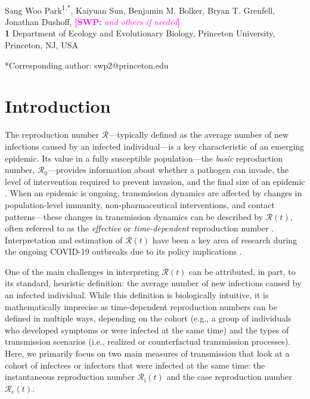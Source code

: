 \documentclass[12pt]{article}
\date{\today}
\newcommand{\comment}{\showcomment}
\newcommand{\showcomment}[3]{\textcolor{#1}{\textbf{[#2: }\textsl{#3}\textbf{]}}}
\newcommand{\swp}[1]{\comment{magenta}{SWP}{#1}}
\newcommand{\Rx}[1]{\ensuremath{{\mathcal R}_{#1}}\xspace}
\newcommand{\Ro}{\Rx{0}}
\newcommand{\Rc}{\Rx{\mathrm{c}}}
\newcommand{\Ri}{\Rx{\mathrm{i}}}
\newcommand{\RR}{\ensuremath{{\mathcal R}}\xspace}
\begin{document}
\begin{flushleft}{
	\Large
	\textbf{}
}
\newline
\\
Sang Woo Park\textsuperscript{1,*}, Kaiyuan Sun, Benjamin M. Bolker, Bryan T. Grenfell, Jonathan Dushoff, \swp{and others if needed}
\\
\bigskip
\textbf{1} Department of Ecology and Evolutionary Biology, Princeton University, Princeton, NJ, USA
\\
\bigskip

*Corresponding author: swp2@princeton.edu
\end{flushleft}

\section{Introduction}

The reproduction number \RR---typically defined as the average number of new infections caused by an infected individual---is a key characteristic of an emerging epidemic.
Its value in a fully susceptible population---the \emph{basic} reproduction number, \Ro---provides information about whether a pathogen can invade, the level of intervention required to prevent invasion, and the final size of an epidemic \citep{diekmann1990definition,anderson1991infectious}.
When an epidemic is ongoing, transmission dynamics are affected by changes in population-level immunity, non-pharmaceutical interventions, and contact patterns---these changes in transmission dynamics can be described by $\RR(t)$, often referred to as the \emph{effective} or \emph{time-dependent} reproduction number \citep{wallinga2004different, fraser2007estimating, cori2013new}.
Interpretation and estimation of $\RR(t)$ have been a key area of research during the ongoing COVID-19 outbreaks due to its policy implications \citep{pan2020association,flaxman2020estimating,gostic2020practical}.

One of the main challenges in interpreting $\RR(t)$ can be attributed, in part, to its standard, heuristic definition: the average number of new infections caused by an infected individual.
While this definition is biologically intuitive, it is mathematically imprecise as time-dependent reproduction numbers can be defined in multiple ways, depending on the cohort (e.g., a group of individuals who developed symptoms or were infected at the same time) and the types of transmission scenarios (i.e., realized or counterfactual transmission processes).
Here, we primarily focus on two main measures of transmission that look at a cohort of infectees or infectors that were infected at the same time: the instantaneous reproduction number $\Ri(t)$ and the case reproduction number $\Rc(t)$.
\end{document}
